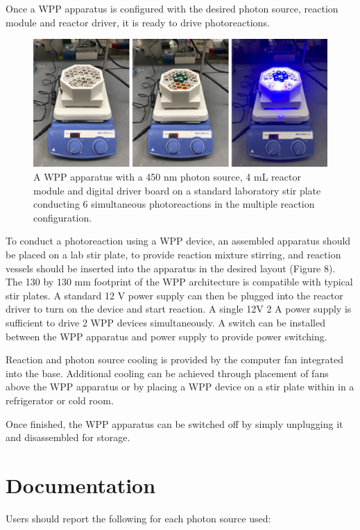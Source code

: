 \documentclass[11pt]{article}
\let\stdsection\section
\renewcommand\section{\clearpage\stdsection}
\begin{document}
Once a WPP apparatus is configured with the desired photon source, reaction module and reactor driver, it is ready to drive photoreactions.

\begin{figure}[H]
	\centering
	\includegraphics[width=\textwidth]{"./fign8.png"}
	\caption{A WPP apparatus with a 450 nm photon source, 4 mL reactor module and digital driver board on a standard laboratory stir plate conducting 6 simultaneous photoreactions in the multiple reaction configuration.}
\end{figure}


To conduct a photoreaction using a WPP device, an assembled apparatus should be placed on a lab stir plate, to provide reaction mixture stirring, and reaction vessels should be inserted into the apparatus in the desired layout (Figure 8).
The 130 by 130 mm footprint of the WPP architecture is compatible with typical stir plates.
A standard 12 V power supply can then be plugged into the reactor driver to turn on the device and start reaction.
A single 12V 2 A power supply is sufficient to drive 2 WPP devices simultaneously.
A switch can be installed between the WPP apparatus and power supply to provide power switching.

Reaction and photon source cooling is provided by the computer fan integrated into the base.
Additional cooling can be achieved through placement of fans above the WPP apparatus or by placing a WPP device on a stir plate within in a refrigerator or cold room.

Once finished, the WPP apparatus can be switched off by simply unplugging it and disassembled for storage.

\section{Documentation}

Users should report the following for each photon source used:
\end{document}
